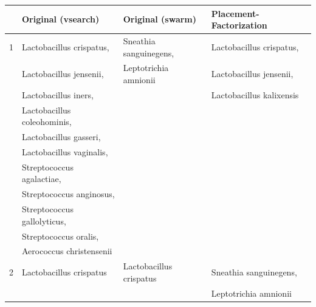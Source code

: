 \begin{table}[p]
{%
}
\label{tab:bv_phylofactor_clades}
{
    \newcommand{\rc}{\rowcolor{black!12}}
    \begin{center}
    \begin{tabular}{rlll}
        \toprule
             &  Original (vsearch)          & Original (swarm)        & Placement-Factorization   \\
        \midrule
\rc{}   1    & Lactobacillus crispatus,     & Sneathia sanguinegens,  & Lactobacillus crispatus,   \\
\rc{}        & Lactobacillus jensenii,      & Leptotrichia amnionii   & Lactobacillus jensenii,    \\
\rc{}        & Lactobacillus iners,         &                         & Lactobacillus kalixensis   \\
\rc{}        & Lactobacillus coleohominis,  &                         &     \\
\rc{}        & Lactobacillus gasseri,       &                         &     \\
\rc{}        & Lactobacillus vaginalis,     &                         &     \\
\rc{}        & Streptococcus agalactiae,    &                         &     \\
\rc{}        & Streptococcus anginosus,     &                         &     \\
\rc{}        & Streptococcus gallolyticus,  &                         &     \\
\rc{}        & Streptococcus oralis,        &                         &     \\
\rc{}        & Aerococcus christensenii     &                         &     \\
        2    & Lactobacillus crispatus      & Lactobacillus crispatus & Sneathia sanguinegens,     \\
             &                              &                         & Leptotrichia amnionii      \\

\end{tabular}
\end{center}}
\end{table}
